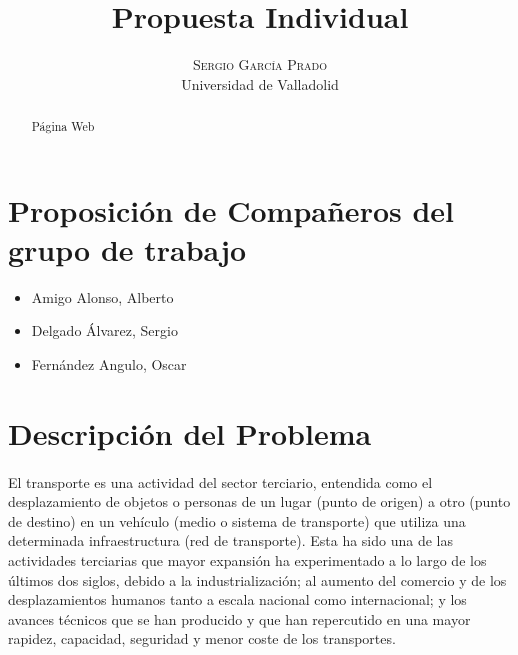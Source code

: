 \documentclass[10pt, a4paper,spanish]{article}
\title{\vspace{-15mm}\fontsize{24pt}{10pt}\selectfont\textbf{Propuesta Individual}} %
\author{
\large
\textsc{Sergio García Prado}\\[2mm] %
\normalsize Universidad de Valladolid \\ %
\vspace{-5mm}
}
\date{}
\begin{document}
	\maketitle %

	\thispagestyle{fancy} %


	\begin{abstract}
		\noindent Página Web
	\end{abstract}


		\section{Proposición de Compañeros del grupo de trabajo}

			\begin{center}
				\begin{varwidth}{\textwidth}
					\begin{itemize}
						\item Amigo Alonso, Alberto
						\item Delgado Álvarez, Sergio
						\item Fernández Angulo, Oscar
					\end{itemize}
				\end{varwidth}
			\end{center}

		\section{Descripción del Problema}

			\paragraph{}
			El transporte es una actividad del sector terciario, entendida como el desplazamiento de objetos o personas de un lugar (punto de origen) a otro (punto de destino) en un vehículo (medio o sistema de transporte) que utiliza una determinada infraestructura (red de transporte). Esta ha sido una de las actividades terciarias que mayor expansión ha experimentado a lo largo de los últimos dos siglos, debido a la industrialización; al aumento del comercio y de los desplazamientos humanos tanto a escala nacional como internacional; y los avances técnicos que se han producido y que han repercutido en una mayor rapidez, capacidad, seguridad y menor coste de los transportes. \cite{wikipedia_transporte}
\end{document}
